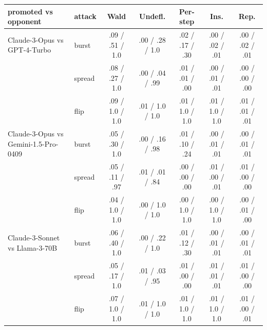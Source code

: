 \begin{tabular}{llccccc}
\toprule
promoted vs opponent & attack & Wald & Undefl. & Per-step & Ins. & Rep. \\
\midrule
Claude-3-Opus vs GPT-4-Turbo & burst & .09 / .51 / 1.0 & .00 / .28 / 1.0 & .02 / .17 / .30 & .00 / .02 / .01 & .00 / .02 / .01 \\
 & spread & .08 / .27 / 1.0 & .00 / .04 / .99 & .01 / .01 / .00 & .00 / .01 / .01 & .00 / .00 / .00 \\
 & flip & .09 / 1.0 / 1.0 & .01 / 1.0 / 1.0 & .01 / 1.0 / 1.0 & .01 / 1.0 / 1.0 & .01 / .01 / .01 \\
Claude-3-Opus vs Gemini-1.5-Pro-0409 & burst & .05 / .30 / 1.0 & .00 / .16 / .98 & .01 / .10 / .24 & .00 / .01 / .01 & .00 / .01 / .01 \\
 & spread & .05 / .11 / .97 & .01 / .01 / .84 & .00 / .00 / .00 & .01 / .00 / .01 & .01 / .00 / .00 \\
 & flip & .04 / 1.0 / 1.0 & .00 / 1.0 / 1.0 & .00 / 1.0 / 1.0 & .00 / 1.0 / 1.0 & .00 / .01 / .00 \\
Claude-3-Sonnet vs Llama-3-70B & burst & .06 / .40 / 1.0 & .00 / .22 / 1.0 & .01 / .12 / .30 & .00 / .01 / .01 & .00 / .01 / .01 \\
 & spread & .05 / .17 / 1.0 & .01 / .03 / .95 & .01 / .00 / .00 & .01 / .01 / .01 & .01 / .00 / .00 \\
 & flip & .07 / 1.0 / 1.0 & .01 / 1.0 / 1.0 & .01 / 1.0 / 1.0 & .01 / 1.0 / 1.0 & .01 / .00 / .01 \\
\bottomrule
\end{tabular}